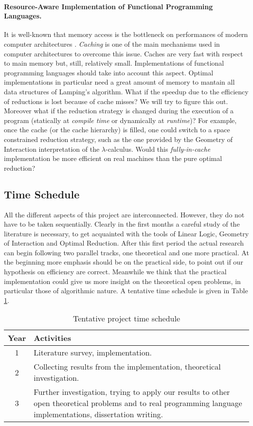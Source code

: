 \documentclass[english]{scrartcl}
\begin{document}
\paragraph{Resource-Aware Implementation of Functional Programming Languages.}It is well-known that memory access is the bottleneck on performances of modern computer architectures \cite{hennessy_computer_2011}. \emph{Caching} is one of the main mechanisms used in computer architectures to overcome this issue. Caches are very fast with respect to main memory but, still, relatively small. Implementations of functional programming languages should take into account this aspect. Optimal implementations in particular need a great amount of memory to mantain all data structures of Lamping's algorithm. What if the speedup due to the efficiency of reductions is lost because of cache misses? We will try to figure this out. Moreover what if the reduction strategy is changed during the execution of a program (statically at \emph{compile time} or dynamically at \emph{runtime})? For example, once the cache (or the cache hierarchy) is filled, one could switch to a space constrained reduction strategy, such as the one provided by the Geometry of Interaction interpretation of the $\lambda$-calculus. Would this \emph{fully-in-cache} implementation be more efficient on real machines than the pure optimal reduction?
\subsection*{Time Schedule}All the different aspects of this project are interconnected. However, they do not have to be taken sequentially. Clearly in the first months a careful study of the literature is necessary, to get acquainted with the tools of Linear Logic, Geometry of Interaction and Optimal Reduction. After this first period the actual research can begin following two parallel tracks, one theoretical and one more practical. At the beginning more emphasis should be on the practical side, to point out if our hypothesis on efficiency are correct. Meanwhile we think that the practical implementation could give us more insight on the theoretical open problems, in particular those of algorithmic nature. A tentative time schedule is given in Table \ref{table:schedule}.
\begin{table}[h]
	\centering
	\begin{tabular}{|c|>{\raggedright}m{10cm}|}
		\hline 
		\textbf{Year} & \textbf{Activities}\tabularnewline
		\hline 
		1 & Literature survey, implementation. \tabularnewline
		\hline 
		2 & Collecting results from the implementation, theoretical investigation. \tabularnewline
		\hline 
		3 & Further investigation, trying to apply our results to other open theoretical problems and to real programming language implementations, dissertation writing. \tabularnewline
		\hline 
	\end{tabular}
	\caption{Tentative project time schedule}
	\label{table:schedule}
\end{table}
\end{document}
